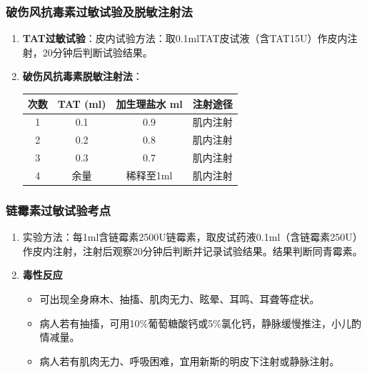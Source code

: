 \documentclass[11pt, a4paper]{ctexart}
\begin{document}
\subsubsection{破伤风抗毒素过敏试验及脱敏注射法}
\begin{enumerate}
	\item \textbf{TAT过敏试验}：皮内试验方法：取0.1mlTAT皮试液（含TAT15U）作皮内注射，20分钟后判断试验结果。
	\item \textbf{破伤风抗毒素脱敏注射法}：
	      \begin{table}[htbp]
		      \centering
		      \begin{tabular}{|c|c|c|c|}
			      \hline
			      \textbf{次数} & \textbf{TAT (ml)} & \textbf{加生理盐水 ml} & \textbf{注射途径} \\
			      \hline
			      1           & 0.1               & 0.9               & 肌内注射          \\
			      2           & 0.2               & 0.8               & 肌内注射          \\
			      3           & 0.3               & 0.7               & 肌内注射          \\
			      4           & 余量                & 稀释至1ml            & 肌内注射          \\
			      \hline
		      \end{tabular}
	      \end{table}
\end{enumerate}

\subsubsection{链霉素过敏试验考点}
\begin{enumerate}
	\item 实验方法：每1ml含链霉素2500U链霉素，取皮试药液0.1ml（含链霉素250U）作皮内注射，注射后观察20分钟后判断并记录试验结果。结果判断同青霉素。
	\item \textbf{毒性反应}
	      \begin{itemize}
		      \item 可出现全身麻木、抽搐、肌肉无力、眩晕、耳鸣、耳聋等症状。
		      \item 病人若有抽搐，可用10\%葡萄糖酸钙或5\%氯化钙，静脉缓慢推注，小儿酌情减量。
		      \item 病人若有肌肉无力、呼吸困难，宜用新斯的明皮下注射或静脉注射。
	      \end{itemize}
\end{enumerate}
\end{document}
